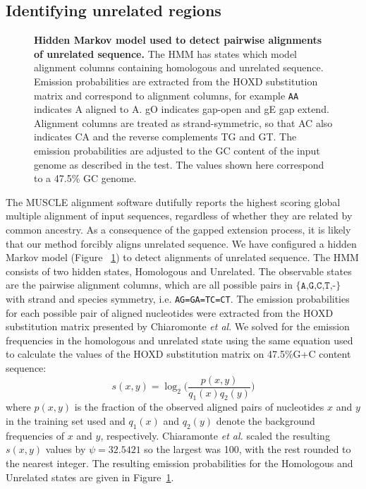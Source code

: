 \documentclass{llncs}
\begin{document}
\subsection{Identifying unrelated regions}
\begin{figure}[t]
\centering {}
\caption{\textbf{Hidden Markov model used to detect pairwise alignments of unrelated
sequence.} The HMM has states which model alignment columns containing
homologous and unrelated sequence. Emission probabilities are extracted from the HOXD substitution matrix and correspond to alignment
columns, for example \texttt{AA} indicates A aligned to A.  gO
indicates gap-open and gE gap extend. Alignment columns are treated as
strand-symmetric, so that AC also indicates CA and the reverse
complements TG and GT.  The emission probabilities are adjusted to the GC content of the input genome
as described in the test.  The values shown here correspond to a 47.5\% GC genome.}
\label{fig-hmm}\vspace{-0.2cm}
\end{figure}
The MUSCLE alignment software dutifully reports the highest scoring
global multiple alignment of input sequences, regardless of whether
they are related by common ancestry. As a consequence of the gapped
extension process, it is likely that our method forcibly aligns unrelated
sequence. We have configured a hidden Markov model (Figure
~\ref{fig-hmm}) to detect alignments of unrelated sequence. The HMM
consists of two hidden states, Homologous and Unrelated. The
observable states are the pairwise alignment columns, which are all
possible pairs in $\texttt{{\{A,G,C,T,-\}}}$ with strand and species
symmetry, i.e. \texttt{AG=GA=TC=CT}. The emission probabilities for
each possible pair of aligned nucleotides were extracted from the HOXD
substitution matrix presented by Chiaromonte \textit{et al}\cite{hoxd}.
We solved for the emission frequencies in the
homologous and unrelated state using the same equation used to
calculate the values of the HOXD substitution matrix on 47.5\%G+C
content sequence\cite{hoxd}:
\begin{equation}
s(x,y)= \log_{2}{\Bigg(\frac{p(x,y)}{q_{1}(x)q_{2}(y)}\Bigg)}
\end{equation}
{w}here $p(x,y)$ is the fraction of the observed aligned pairs of
nucleotides $x$ and $y$ in the training set used and $q_{1}(x)$ and
$q_{2}(y)$ denote the background frequencies of $x$ and $y$,
respectively. Chiaramonte \textit{et al.} scaled the resulting
$s(x,y)$ values by $\psi=32.5421$ so the largest was 100,
with the rest rounded to the nearest integer.  The resulting emission
probabilities for the Homologous and Unrelated states are given
in Figure~\ref{fig-hmm}.
\end{document}
